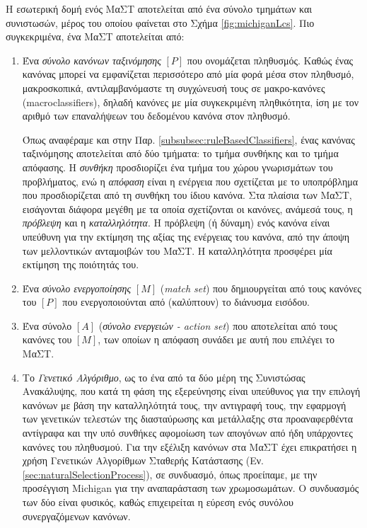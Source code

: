 Η εσωτερική δομή ενός ΜαΣΤ αποτελείται από ένα σύνολο τμημάτων και συνιστωσών, μέρος του οποίου φαίνεται στο Σχήμα \ref{fig:michiganLcs}. Πιο συγκεκριμένα, ένα ΜαΣΤ αποτελείται από:
\begin{enumerate}
\item Ένα \emph{σύνολο κανόνων ταξινόμησης} $[P]$ που ονομάζεται πληθυσμός. Καθώς ένας κανόνας μπορεί να εμφανίζεται περισσότερο από μία φορά μέσα στον πληθυσμό, μακροσκοπικά, αντιλαμβανόμαστε τη συγχώνευσή τους σε μακρο-κανόνες (macroclassifiers), δηλαδή κανόνες με μία συγκεκριμένη πληθικότητα, ίση με τον αριθμό των επαναλήψεων του δεδομένου κανόνα στον πληθυσμό.

Όπως αναφέραμε και στην Παρ. \ref{subsubsec:ruleBasedClassifiers}, ένας κανόνας ταξινόμησης αποτελείται από δύο τμήματα: το τμήμα συνθήκης και το τμήμα απόφασης. Η \emph{συνθήκη} προσδιορίζει ένα τμήμα του χώρου γνωρισμάτων του προβλήματος, ενώ η \emph{απόφαση} είναι η ενέργεια που σχετίζεται με το υποπρόβλημα που προσδιορίζεται από τη συνθήκη του ίδιου κανόνα. Στα πλαίσια των ΜαΣΤ, εισάγονται διάφορα μεγέθη με τα οποία σχετίζονται οι κανόνες, ανάμεσά τους, η \emph{πρόβλεψη} και η \emph{καταλληλότητα}. Η πρόβλεψη (ή δύναμη) ενός κανόνα είναι υπεύθυνη για την εκτίμηση της αξίας της ενέργειας του κανόνα, από την άποψη των μελλοντικών ανταμοιβών του ΜαΣΤ. Η καταλληλότητα προσφέρει μία εκτίμηση της ποιότητάς του.

\item Ένα \textit{σύνολο ενεργοποίησης} $[M]$ (\emph{match set}) που δημιουργείται από τους κανόνες του $[P]$ που ενεργοποιούνται από (καλύπτουν) το διάνυσμα εισόδου.

\item Ένα σύνολο $[A]$ (\emph{σύνολο ενεργειών - action set}) που αποτελείται από τους κανόνες του $[M]$, των οποίων η απόφαση συνάδει με αυτή που επιλέγει το ΜαΣΤ.

\item Το \emph{Γενετικό Αλγόριθμο}, ως το ένα από τα δύο μέρη της Συνιστώσας Ανακάλυψης, που κατά τη φάση της εξερεύνησης είναι υπεύθυνος για την επιλογή κανόνων με βάση την καταλληλότητά τους, την αντιγραφή τους, την εφαρμογή των γενετικών τελεστών της διασταύρωσης και μετάλλαξης στα προαναφερθέντα αντίγραφα και την υπό συνθήκες αφομοίωση των απογόνων από ήδη υπάρχοντες κανόνες του πληθυσμού. Για την εξέλιξη κανόνων στα ΜαΣΤ έχει επικρατήσει η χρήση Γενετικών Αλγορίθμων Σταθερής Κατάστασης (Εν. \ref{sec:naturalSelectionProcess}), σε συνδυασμό, όπως προείπαμε, με την προσέγγιση Michigan για την αναπαράσταση των χρωμοσωμάτων. Ο συνδυασμός των δύο είναι φυσικός, καθώς επιχειρείται η εύρεση ενός συνόλου συνεργαζόμενων κανόνων.


\end{enumerate}
